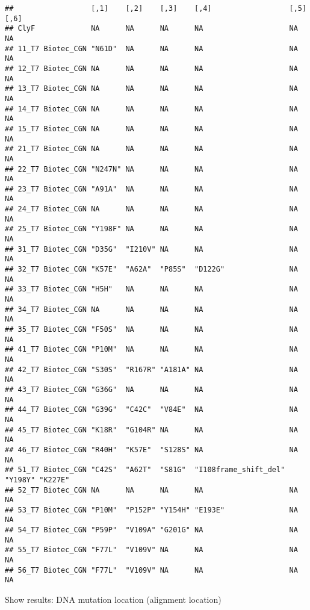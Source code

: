 \documentclass[
]{article}
\begin{document}
\begin{verbatim}
##                  [,1]    [,2]    [,3]    [,4]                  [,5]    [,6]   
## ClyF             NA      NA      NA      NA                    NA      NA     
## 11_T7 Biotec_CGN "N61D"  NA      NA      NA                    NA      NA     
## 12_T7 Biotec_CGN NA      NA      NA      NA                    NA      NA     
## 13_T7 Biotec_CGN NA      NA      NA      NA                    NA      NA     
## 14_T7 Biotec_CGN NA      NA      NA      NA                    NA      NA     
## 15_T7 Biotec_CGN NA      NA      NA      NA                    NA      NA     
## 21_T7 Biotec_CGN NA      NA      NA      NA                    NA      NA     
## 22_T7 Biotec_CGN "N247N" NA      NA      NA                    NA      NA     
## 23_T7 Biotec_CGN "A91A"  NA      NA      NA                    NA      NA     
## 24_T7 Biotec_CGN NA      NA      NA      NA                    NA      NA     
## 25_T7 Biotec_CGN "Y198F" NA      NA      NA                    NA      NA     
## 31_T7 Biotec_CGN "D35G"  "I210V" NA      NA                    NA      NA     
## 32_T7 Biotec_CGN "K57E"  "A62A"  "P85S"  "D122G"               NA      NA     
## 33_T7 Biotec_CGN "H5H"   NA      NA      NA                    NA      NA     
## 34_T7 Biotec_CGN NA      NA      NA      NA                    NA      NA     
## 35_T7 Biotec_CGN "F50S"  NA      NA      NA                    NA      NA     
## 41_T7 Biotec_CGN "P10M"  NA      NA      NA                    NA      NA     
## 42_T7 Biotec_CGN "S30S"  "R167R" "A181A" NA                    NA      NA     
## 43_T7 Biotec_CGN "G36G"  NA      NA      NA                    NA      NA     
## 44_T7 Biotec_CGN "G39G"  "C42C"  "V84E"  NA                    NA      NA     
## 45_T7 Biotec_CGN "K18R"  "G104R" NA      NA                    NA      NA     
## 46_T7 Biotec_CGN "R40H"  "K57E"  "S128S" NA                    NA      NA     
## 51_T7 Biotec_CGN "C42S"  "A62T"  "S81G"  "I108frame_shift_del" "Y198Y" "K227E"
## 52_T7 Biotec_CGN NA      NA      NA      NA                    NA      NA     
## 53_T7 Biotec_CGN "P10M"  "P152P" "Y154H" "E193E"               NA      NA     
## 54_T7 Biotec_CGN "P59P"  "V109A" "G201G" NA                    NA      NA     
## 55_T7 Biotec_CGN "F77L"  "V109V" NA      NA                    NA      NA     
## 56_T7 Biotec_CGN "F77L"  "V109V" NA      NA                    NA      NA
\end{verbatim}

Show results: DNA mutation location (alignment location)
\end{document}
